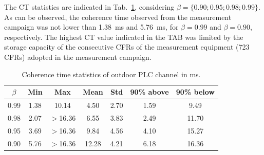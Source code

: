 \documentclass[journal]{IEEEtran}
\begin{document}
The \ac{CT} statistics are indicated in Tab.~\ref{Tab:EstatisticasCT}, considering $\beta=\{0.90;0.95;0.98;0.99\}$. As can be observed, the coherence time observed from the measurement campaign was not lower than 1.38~ms and 5.76~ms, for $\beta=0.99$ and $\beta = 0.90$, respectively. The highest \ac{CT} value indicated in the TAB was limited by the storage capacity of the consecutive \ac{CFR}s of the measurement equipment (723 \ac{CFR}s) adopted in the measurement campaign.

\begin{table}[!htb]
\centering
\caption{Coherence time statistics of outdoor PLC channel in ms.}
\footnotesize 
\begin{tabular}{c|c|c|c|c|c|c}
\hline 
$\beta$    &  Min    & Max    & Mean    & Std     & 90\% above   & 90\% below \\
\hline 
0.99       & 1.38    & 10.14 &  4.50    & 2.70   & 1.59         & 9.49 \\
\hline
0.98       & 2.07    & $>$16.36 &  6.55    & 3.83   & 2.49         & 11.70 \\
\hline
0.95       & 3.69    & $>$16.36 &  9.84    & 4.56   & 4.10         & 15.27 \\
\hline
0.90       & 5.76    & $>$16.36 &  12.28   & 4.21   & 6.18         & 16.36 \\
\hline

\end{tabular} \label{Tab:EstatisticasCT}
\newline
\end{table}  
\end{document}
